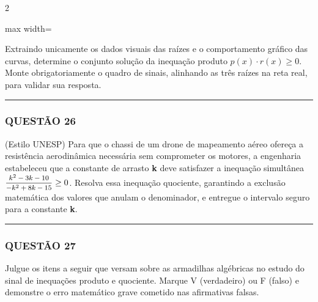\documentclass[twoside, 10pt, a4paper]{article}
\begin{document}
\begin{multicols*}{2}
\begin{center}
\begin{adjustbox}{max width=\linewidth}
\end{adjustbox}
\end{center}

Extraindo unicamente os dados visuais das raízes e o comportamento gráfico das curvas, determine o conjunto solução da inequação produto $ p(x) \cdot r(x) \ge 0 $. Monte obrigatoriamente o quadro de sinais, alinhando as três raízes na reta real, para validar sua resposta.

\vspace{0cm} \noindent\textcolor{CorLinha}{\rule{\linewidth}{0.5pt}} \vspace{-0.2cm}
\subsubsection*{QUESTÃO 26}
(Estilo UNESP) Para que o chassi de um drone de mapeamento aéreo ofereça a resistência aerodinâmica necessária sem comprometer os motores, a engenharia estabeleceu que a constante de arrasto \textbf{k} deve satisfazer a inequação simultânea $ \mfrac{k^2 - 3k - 10}{-k^2 + 8k - 15} \ge 0 $. Resolva essa inequação quociente, garantindo a exclusão matemática dos valores que anulam o denominador, e entregue o intervalo seguro para a constante \textbf{k}.

\vspace{0cm} \noindent\textcolor{CorLinha}{\rule{\linewidth}{0.5pt}} \vspace{-0.2cm}
\subsubsection*{QUESTÃO 27}
Julgue os itens a seguir que versam sobre as armadilhas algébricas no estudo do sinal de inequações produto e quociente. Marque V (verdadeiro) ou F (falso) e demonstre o erro matemático grave cometido nas afirmativas falsas.


\end{multicols*}
\end{document}

